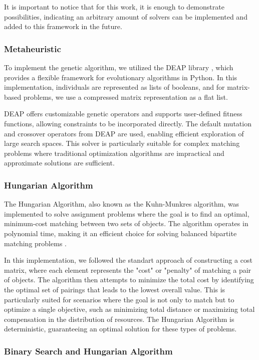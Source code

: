     It is important to notice that for this work, it is enough to demonstrate possibilities, indicating an arbitrary amount of solvers can be implemented and added to this framework in the future.

    \subsubsection{Metaheuristic}
        To implement the genetic algorithm, we utilized the DEAP library \cite{deap}, which provides a flexible framework for evolutionary algorithms in Python.
        In this implementation, individuals are represented as lists of booleans, and for matrix-based problems, we use a compressed matrix representation as a flat list.

        DEAP offers customizable genetic operators and supports user-defined fitness functions, allowing constraints to be incorporated directly. The default mutation and crossover operators from DEAP are used, enabling efficient exploration of large search spaces. This solver is particularly suitable for complex matching problems where traditional optimization algorithms are impractical and approximate solutions are sufficient.
    \subsubsection{Hungarian Algorithm}
    The Hungarian Algorithm, also known as the Kuhn-Munkres algorithm, was implemented to solve assignment problems where the goal is to find an optimal, minimum-cost matching between two sets of objects. The algorithm operates in polynomial time, making it an efficient choice for solving balanced bipartite matching problems \cite{kuhn1955hungarian}. 
    
    In this implementation, we followed the standart approach of constructing a cost matrix, where each element represents the "cost" or "penalty" of matching a pair of objects. The algorithm then attempts to minimize the total cost by identifying the optimal set of pairings that leads to the lowest overall value. This is particularly suited for scenarios where the goal is not only to match but to optimize a single objective, such as minimizing total distance or maximizing total compensation in the distribution of resources. The Hungarian Algorithm is deterministic, guaranteeing an optimal solution for these types of problems.

    \subsubsection{Binary Search and Hungarian Algorithm}

